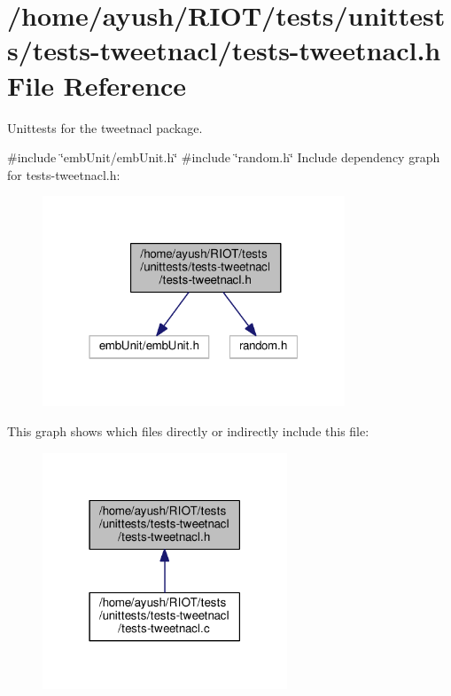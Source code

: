 \hypertarget{tests-tweetnacl_8h}{}\section{/home/ayush/\+R\+I\+O\+T/tests/unittests/tests-\/tweetnacl/tests-\/tweetnacl.h File Reference}
\label{tests-tweetnacl_8h}


Unittests for the {\ttfamily tweetnacl} package.  


{\ttfamily \#include \char`\"{}emb\+Unit/emb\+Unit.\+h\char`\"{}}\newline
{\ttfamily \#include \char`\"{}random.\+h\char`\"{}}\newline
Include dependency graph for tests-\/tweetnacl.h\+:
\nopagebreak
\begin{figure}[H]
\begin{center}
\leavevmode
\includegraphics[width=256pt]{tests-tweetnacl_8h__incl}
\end{center}
\end{figure}
This graph shows which files directly or indirectly include this file\+:
\nopagebreak
\begin{figure}[H]
\begin{center}
\leavevmode
\includegraphics[width=207pt]{tests-tweetnacl_8h__dep__incl}
\end{center}
\end{figure}
